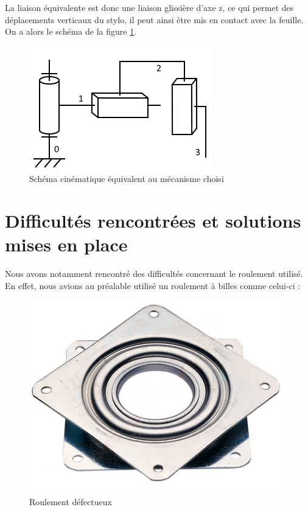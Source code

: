 \documentclass[12pt,a4paper]{report}
\begin{document}
La liaison équivalente est donc une liaison glissière d'axe z, ce qui permet des déplacements verticaux du stylo, il peut ainsi être mis en contact avec la feuille.
On a alors le schéma de la figure \ref{Schema_cine_simp}.

\begin{figure}[!h]
 \center
 \includegraphics[scale=1.1]{../pictures/schema_cinematique_simplifie.png}
 \caption{Schéma cinématique équivalent au mécanisme choisi}
 \label{Schema_cine_simp}
\end{figure}

	\section{Difficultés rencontrées et solutions mises en place}
	Nous avons notamment rencontré des difficultés concernant le roulement utilisé. En effet, nous avions au préalable utilisé un roulement à billes comme celui-ci :
	
	\begin{figure}[!h]
 \center
 \includegraphics[scale=0.5]{../pictures/roulementmerdique}
 \caption{Roulement défectueux}
\end{figure}
\end{document}
